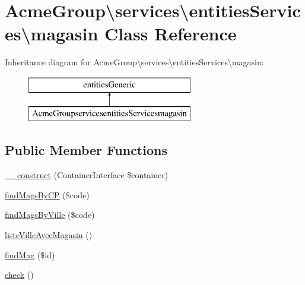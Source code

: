 \hypertarget{class_acme_group_1_1services_1_1entities_services_1_1magasin}{\section{Acme\+Group\textbackslash{}services\textbackslash{}entities\+Services\textbackslash{}magasin Class Reference}
\label{class_acme_group_1_1services_1_1entities_services_1_1magasin}
}
Inheritance diagram for Acme\+Group\textbackslash{}services\textbackslash{}entities\+Services\textbackslash{}magasin\+:\begin{figure}[H]
\begin{center}
\leavevmode
\includegraphics[height=2.000000cm]{class_acme_group_1_1services_1_1entities_services_1_1magasin}
\end{center}
\end{figure}
\subsection*{Public Member Functions}
\begin{DoxyCompactItemize}
\item 
\hyperlink{class_acme_group_1_1services_1_1entities_services_1_1magasin_a8c79fa35cf7a44e29f99848897bad884}{\+\_\+\+\_\+construct} (Container\+Interface \$container)
\item 
\hyperlink{class_acme_group_1_1services_1_1entities_services_1_1magasin_a3dcbadab666c3f8b1a3341d4197dc195}{find\+Mags\+By\+C\+P} (\$code)
\item 
\hyperlink{class_acme_group_1_1services_1_1entities_services_1_1magasin_a0038bb0d05f2c16d1e68cadc8fad7b03}{find\+Mags\+By\+Ville} (\$code)
\item 
\hyperlink{class_acme_group_1_1services_1_1entities_services_1_1magasin_ae4a1ccad70573f80576240697ac1cdb1}{liste\+Ville\+Avec\+Magasin} ()
\item 
\hyperlink{class_acme_group_1_1services_1_1entities_services_1_1magasin_ac5d9bbe444f0eb360f7f1d3a5210d041}{find\+Mag} (\$id)
\item 
\hyperlink{class_acme_group_1_1services_1_1entities_services_1_1magasin_a844cfddf131e53e93b2c786dfc6559c3}{check} ()
\end{DoxyCompactItemize}
